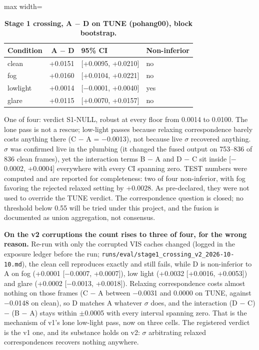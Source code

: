 \documentclass[10pt]{article}
\begin{document}
\begin{table}[htbp]
\centering
\small
\caption{\textbf{Stage 1 crossing, A $-$ D on TUNE (pohang00), block bootstrap.}}
\label{tab:13}
\begin{adjustbox}{max width=\linewidth}
\begin{tabular}{lrll}
\toprule
Condition & A $-$ D & 95\% CI & Non-inferior \\
\midrule
clean & +0.0151 & [+0.0095, +0.0210] & no \\
fog & +0.0160 & [+0.0104, +0.0221] & no \\
lowlight & +0.0014 & [$-$0.0001, +0.0040] & yes \\
glare & +0.0115 & [+0.0070, +0.0157] & no \\
\bottomrule
\end{tabular}
\end{adjustbox}
\end{table}
One of four: verdict S1-NULL, robust at every floor from 0.0014 to 0.0100. The lone pass is not a rescue; low-light passes because relaxing correspondence barely costs anything there (C $-$ A = $-$0.0013), not because live $\sigma$ recovered anything. $\sigma$ was confirmed live in the plumbing (it changed the fused output on 753--836 of 836 clean frames), yet the interaction terms B $-$ A and D $-$ C sit inside [$-$0.0002, +0.0004] everywhere with every CI spanning zero. TEST numbers were computed and are reported for completeness: two of four non-inferior, with fog favoring the rejected relaxed setting by +0.0028. As pre-declared, they were not used to override the TUNE verdict. The correspondence question is closed; no threshold below 0.55 will be tried under this project, and the fusion is documented as union aggregation, not consensus.

\textbf{On the v2 corruptions the count rises to three of four, for the wrong reason.} Re-run with only the corrupted VIS caches changed (logged in the exposure ledger before the run; \texttt{runs/\allowbreak{}eval/\allowbreak{}stage1\_\allowbreak{}crossing\_\allowbreak{}v2\_\allowbreak{}2026-10-10.md}), the clean cell reproduces exactly and still fails, while D is non-inferior to A on fog (+0.0001 [$-$0.0007, +0.0007]), low light (+0.0032 [+0.0016, +0.0053]) and glare (+0.0002 [$-$0.0013, +0.0018]). Relaxing correspondence costs almost nothing on those frames (C $-$ A between $-$0.0031 and 0.0000 on TUNE, against $-$0.0148 on clean), so D matches A whatever $\sigma$ does, and the interaction (D $-$ C) $-$ (B $-$ A) stays within $\pm$0.0005 with every interval spanning zero. That is the mechanism of v1's lone low-light pass, now on three cells. The registered verdict is the v1 one, and its substance holds on v2: $\sigma$ arbitrating relaxed correspondences recovers nothing anywhere.
\end{document}
